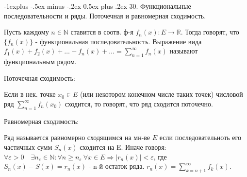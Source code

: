 \documentclass[unicode,10pt, landscape]{article}
\makeatletter
\renewcommand{\subsection}{\@startsection{subsection}{2}{0mm}%
                                {-1explus -.5ex minus -.2ex}%
                                {0.5ex plus .2ex}%
                                {\normalfont\normalsize\bfseries}}
\makeatother
\begin{document}
\begin{multicols}{4}

 \subsection{30. Функциональные последовательности и ряды. Поточечная и равномерная сходимость.}
 \begin{Def}
  Пусть каждому $n \in \mathbb{N}$ ставится в соотв. ф-я $f_n(x): E \to \mathbb{R}$. Тогда говорят, что $\{f_n(x)\}$ - функциональная последовательность.
  Выражение вида $f_1(x) + f_2(x) + \ldots + f_n(x) + \ldots = \sum_{n=1}^\infty f_n(x)$ называют функциональным рядом.
 \end{Def}
 Поточечная сходимость:
 \begin{Def}
  Если в нек. точке $x_0 \in E$ (или некотором конечном числе таких точек) числовой ряд $\sum_{n=1}^\infty f_n(x_0)$ сходится, то говорят, что ряд сходится поточечно.
 \end{Def}
 Равномерная сходимость:
 \begin{Def}
  Ряд называется равномерно сходящимся на мн-ве $E$ если последовательноть его частичных сумм $S_n(x)$ сходится на E. Иначе говоря: $\forall \varepsilon >0 \quad \exists n_{ \varepsilon  }\in \mathbb{N}: \forall n \ge n_\varepsilon \  \forall x \in E  \Rightarrow \left|r_n(x)\right| < \varepsilon$, где $ S_n(x)-S(x)=r_n(x)$ - n-й остаток ряда. $r_n(x) =\sum_{k = n + 1}^\infty f_k(x)$.
 \end{Def}



\end{multicols}
\end{document}
